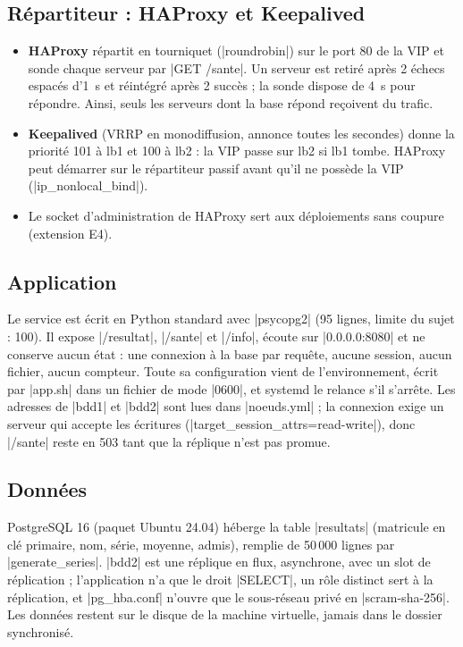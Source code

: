 \documentclass[a4paper,11pt]{article}
\begin{document}
\subsection{Répartiteur : HAProxy et Keepalived}
\begin{itemize}
  \item \textbf{HAProxy} répartit en tourniquet (|roundrobin|) sur le port 80 de la VIP et sonde chaque serveur par |GET /sante|. Un serveur est retiré après 2 échecs espacés d'1~s et réintégré après 2 succès ; la sonde dispose de 4~s pour répondre. Ainsi, seuls les serveurs dont la base répond reçoivent du trafic.
  \item \textbf{Keepalived} (VRRP en monodiffusion, annonce toutes les secondes) donne la priorité 101 à lb1 et 100 à lb2 : la VIP passe sur lb2 si lb1 tombe. HAProxy peut démarrer sur le répartiteur passif avant qu'il ne possède la VIP (|ip_nonlocal_bind|).
  \item Le socket d'administration de HAProxy sert aux déploiements sans coupure (extension E4).
\end{itemize}

\subsection{Application}

Le service est écrit en Python standard avec |psycopg2| (95 lignes, limite du sujet : 100). Il expose |/resultat|, |/sante| et |/info|, écoute sur |0.0.0.0:8080| et ne conserve aucun état : une connexion à la base par requête, aucune session, aucun fichier, aucun compteur. Toute sa configuration vient de l'environnement, écrit par |app.sh| dans un fichier de mode |0600|, et systemd le relance s'il s'arrête. Les adresses de |bdd1| et |bdd2| sont lues dans |noeuds.yml| ; la connexion exige un serveur qui accepte les écritures (|target_session_attrs=read-write|), donc |/sante| reste en 503 tant que la réplique n'est pas promue.

\subsection{Données}

PostgreSQL 16 (paquet Ubuntu 24.04) héberge la table |resultats| (matricule en clé primaire, nom, série, moyenne, admis), remplie de 50\,000 lignes par |generate_series|. |bdd2| est une réplique en flux, asynchrone, avec un slot de réplication ; l'application n'a que le droit |SELECT|, un rôle distinct sert à la réplication, et |pg_hba.conf| n'ouvre que le sous-réseau privé en |scram-sha-256|. Les données restent sur le disque de la machine virtuelle, jamais dans le dossier synchronisé.
\end{document}
